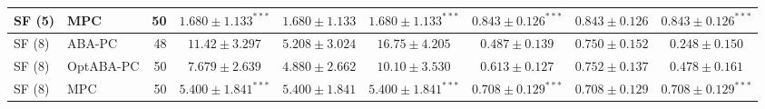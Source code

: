 \begin{table}[t]
{\begin{tabular}{llrcccccc}
SF (5) & MPC & 50 & $\mathbf{1.680\pm1.133}^{\ast\ast\ast}$ & $1.680\pm1.133$ & $\mathbf{1.680\pm1.133}^{\ast\ast\ast}$ & $\mathbf{0.843\pm0.126}^{\ast\ast\ast}$ & $0.843\pm0.126$ & $\mathbf{0.843\pm0.126}^{\ast\ast\ast}$\\
\midrule
SF (8) & ABA-PC & 48 & $11.42\pm3.297$ & $\mathbf{5.208\pm3.024}$ & $16.75\pm4.205$ & $0.487\pm0.139$ & $\mathbf{0.750\pm0.152}$ & $0.248\pm0.150$\\
SF (8) & OptABA-PC & 50 & $7.679\pm2.639$ & $\mathbf{4.880\pm2.662}$ & $10.10\pm3.530$ & $0.613\pm0.127$ & $\mathbf{0.752\pm0.137}$ & $0.478\pm0.161$\\
SF (8) & MPC & 50 & $\mathbf{5.400\pm1.841}^{\ast\ast\ast}$ & $\mathbf{5.400\pm1.841}$ & $\mathbf{5.400\pm1.841}^{\ast\ast\ast}$ & $\mathbf{0.708\pm0.129}^{\ast\ast\ast}$ & $\mathbf{0.708\pm0.129}$ & $\mathbf{0.708\pm0.129}^{\ast\ast\ast}$\\
\bottomrule
\end{tabular}%
}
\end{table}
